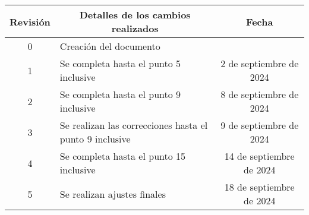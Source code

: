 \begin{table}[ht]
	\label{tab:registro}
	\centering
	\begin{tabularx}{\linewidth}{@{}|c|X|c|@{}}
		\hline
		\rowcolor[HTML]{C0C0C0}
		Revisión & \multicolumn{1}{c|}{\cellcolor[HTML]{C0C0C0}Detalles de los cambios realizados} & Fecha                        \\ \hline
		0        & Creación del documento                                                          & \fechaInicioName             \\ \hline
		1        & Se completa hasta el punto 5 inclusive                                          & {2} de {septiembre} de 2024  \\ \hline
		2        & Se completa hasta el punto 9 inclusive                                          & {8} de {septiembre} de 2024  \\ \hline
		3        & Se realizan las correcciones hasta el punto 9 inclusive                         & {9} de {septiembre} de 2024  \\ \hline
		4        & Se completa hasta el punto 15 inclusive                                         & {14} de {septiembre} de 2024 \\ \hline
		5        & Se realizan ajustes finales                                                     & {18} de {septiembre} de 2024 \\ \hline

	\end{tabularx}
\end{table}